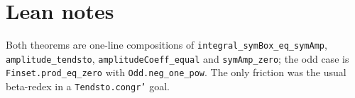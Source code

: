 \documentclass[11pt]{article}
\begin{document}
\section{Lean notes}
Both theorems are one-line compositions of \texttt{integral\_symBox\_eq\_symAmp},
\texttt{amplitude\_tendsto}, \texttt{amplitudeCoeff\_equal} and \texttt{symAmp\_zero}; the odd case is
\texttt{Finset.prod\_eq\_zero} with \texttt{Odd.neg\_one\_pow}. The only friction was the usual
beta-redex in a \texttt{Tendsto.congr'} goal.
\end{document}
